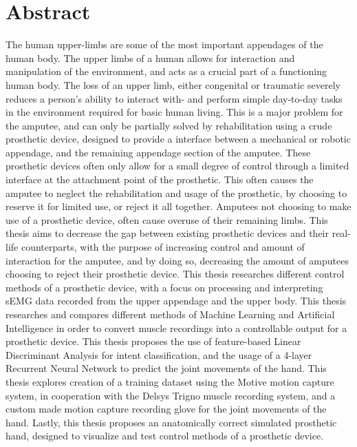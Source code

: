 \documentclass[../main.tex]{subfiles}
\begin{document}
\section*{Abstract}

The human upper-limbs are some of the most important appendages of the human body.
The upper limbs of a human allows for interaction and manipulation of the environment, and acts as a crucial part of a functioning human body.
The loss of an upper limb, either congenital or traumatic severely reduces a person's ability to interact with- and perform simple day-to-day tasks in the environment required for basic human living.
This is a major problem for the amputee, and can only be partially solved by rehabilitation using a crude prosthetic device, designed to provide a interface between a mechanical or robotic appendage, and the remaining appendage section of the amputee.
These prosthetic devices often only allow for a small degree of control through a limited interface at the attachment point of the prosthetic.
This often causes the amputee to neglect the rehabilitation and usage of the prosthetic, by choosing to reserve it for limited use, or reject it all together.
Amputees not choosing to make use of a prosthetic device, often cause overuse of their remaining limbs.
This thesis aims to decrease the gap between existing prosthetic devices and their real-life counterparts, with the purpose of increasing control and amount of interaction for the amputee, and by doing so, decreasing the amount of amputees choosing to reject their prosthetic device. 
This thesis researches different control methods of a prosthetic device, with a focus on processing and interpreting sEMG data recorded from the upper appendage and the upper body.
This thesis researches and compares different methods of Machine Learning and Artificial Intelligence in order to convert muscle recordings into a controllable output for a prosthetic device.
This thesis proposes the use of feature-based Linear Discriminant Analysis for intent classification, and the usage of a 4-layer Recurrent Neural Network to predict the joint movements of the hand.
This thesis explores creation of a training dataset using the Motive motion capture system, in cooperation with the Delsys Trigno muscle recording system, and a custom made motion capture recording glove for the joint movements of the hand.
Lastly, this thesis proposes an anatomically correct simulated prosthetic hand, designed to visualize and test control methods of a prosthetic device.


\end{document}
